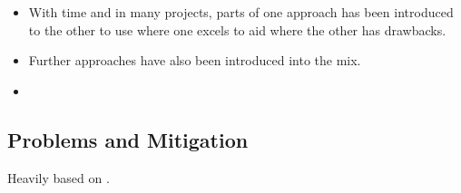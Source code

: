 \documentclass{article}
\begin{document}
\begin{multicols}{2}
\begin{itemize}
\begin{itemize}
                  \item {}\cite{EvaluatingFuzzTesting}
              \end{itemize}
        \item With time and in many projects, parts of one approach has been introduced to the other to use where one excels to aid where the other has drawbacks.
        \item Further approaches have also been introduced into the mix.
        \item {}\cite{AllYouEverWanted}
    \end{itemize}

    \subsection{Problems and Mitigation}
    Heavily based on \cite{ReviewThreeDecades, PreliminaryAssessment}.


\end{multicols}
\end{document}

